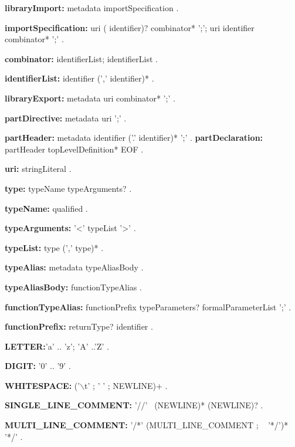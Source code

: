 \begin{grammar}
{\bf libraryImport:}
   metadata importSpecification
    .
 
 {\bf importSpecification:}
    \IMPORT{}  uri (\AS{} identifier)?  combinator* ';';
     \IMPORT{}  uri \DEFERRED{} \AS{} identifier  combinator* ';'
    .
       
{\bf combinator:}\SHOW{} identifierList;
\HIDE{} identifierList
    .
    
    {\bf identifierList:}
      identifier (',' identifier)*
      .
 \end{grammar}
\begin{grammar}
{\bf libraryExport:}
   metadata \EXPORT{}  uri  combinator* ';'
    .
 \end{grammar}
\begin{grammar}
{\bf partDirective:}
   metadata \PART{}   uri ';' 
    .

{\bf partHeader:}
      metadata \PART{} \OF{} identifier ('.' identifier)* ';'
    .
{\bf partDeclaration:}
      partHeader topLevelDefinition* EOF
    .
\end{grammar}
\begin{grammar}
{\bf uri:}
      stringLiteral
    .
\end{grammar}
\begin{grammar}
{\bf type:}
      typeName typeArguments?
    .

{\bf typeName:}
      qualified 
    .

{\bf typeArguments:}
      '<' typeList '>'
    .

{\bf typeList:}
      type (',' type)*
    .
 \end{grammar}
\begin{grammar}

{\bf typeAlias:}
  metadata  \TYPEDEF{} typeAliasBody
  .
  
{\bf typeAliasBody:}
  functionTypeAlias
  .

{\bf functionTypeAlias:}
       functionPrefix  typeParameters? formalParameterList ';'
    .
    
    {\bf functionPrefix:}
    returnType? identifier
    .
    
 \end{grammar}
\begin{grammar}
 {\bf LETTER:}'a' .. 'z';
     'A' ..'Z'
    .

{\bf DIGIT:}
      '0' .. '9'
    .

{\bf WHITESPACE:}
      ('$\backslash$t' ; ' ' ; NEWLINE)+
    .
\end{grammar}
\begin{grammar}{\bf SINGLE_LINE_COMMENT:}
      '//' ~(NEWLINE)* (NEWLINE)?
    .

{\bf MULTI_LINE_COMMENT:}
      '/*' (MULTI_LINE_COMMENT ; ~ '*/')* '*/'
    .
 \end{grammar}